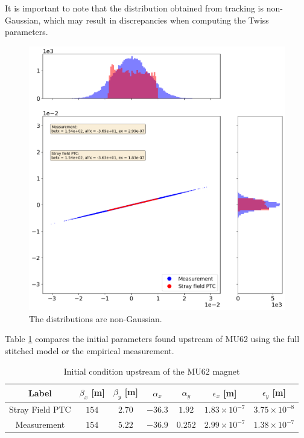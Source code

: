 It is important to note that the distribution obtained from tracking is non-Gaussian, which may result in discrepancies when computing the Twiss parameters.

\begin{figure}[H]
\centering
\includegraphics[width=1.0\textwidth]{02_Simulation/images/non_gaussian.png}
\caption{The distributions are non-Gaussian.}
\label{fig:non_gaussian}
\end{figure}

Table \ref{tab:twiss_parameters} compares the initial parameters found upstream of MU62 using the full stitched model or the empirical measurement.

\begin{table}[htbp]
\centering
\caption{Initial condition upstream of the MU62 magnet}
\label{tab:twiss_parameters}
\begin{tabular}{|c|c|c|c|c|c|c|}
\hline
Label & $\beta_{x}$ [m] & $\beta_{y}$ [m] & $\alpha_{x}$ & $\alpha_{y}$ & $\epsilon_x$ [m] & $\epsilon_y$ [m] \\
\hline
Stray Field PTC & $154$ & $2.70$ & $-36.3$ & $1.92$ & $1.83 \times 10^{-7}$ & $3.75 \times 10^{-8}$ \\
\hline
Measurement & $154$ & $5.22$ & $-36.9$ & $0.252$ & $2.99 \times 10^{-7}$ & $1.38 \times 10^{-7}$ \\
\hline
\end{tabular}
\end{table}

